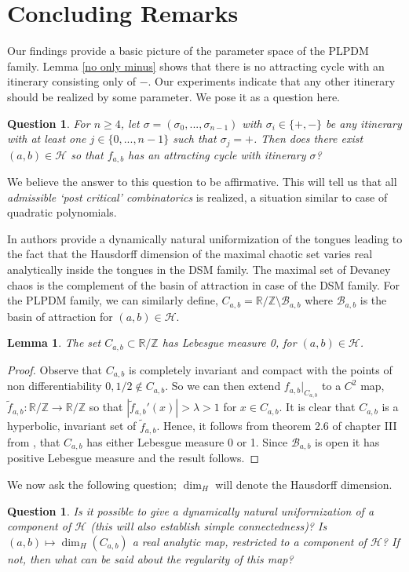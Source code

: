 \documentclass[12pt]{amsart}
\numberwithin{equation}{section}
\newtheorem{lemma}[theorem]{Lemma}
\newtheorem{qn}[theorem]{Question}
\theoremstyle{remark}
\begin{document}
{\section{Concluding Remarks}
Our findings provide a basic picture of the parameter space of the PLPDM family. Lemma \ref{no only minus} shows that there is no attracting cycle with an itinerary consisting only of $-$.  Our experiments indicate that any other itinerary should be realized by some parameter. We pose it as a question here. 
\begin{qn}
    For $ n \geq 4$,  let $\sigma=(\sigma_0,...,\sigma_{n-1}) $ with $\sigma_i \in \{+,-\}$ be any itinerary with at least one $j \in \{0,...,n-1\}$  such that $\sigma_j=+$. Then does there exist $(a,b) \in \mathcal{H}$ so that $f_{a,b}$ has an attracting cycle with itinerary $\sigma$?
\end{qn}
We believe the answer to this question to be affirmative. This will tell us that all \textit{admissible `post critical' combinatorics} is realized, a situation similar to case of quadratic polynomials.   
\vspace{.1cm}

In \cite{BBM} authors provide a dynamically natural uniformization of the tongues leading to the fact that the Hausdorff dimension of the maximal chaotic set varies real analytically inside the tongues in the DSM family. The maximal set of Devaney chaos is the  complement of the basin of attraction in case of the DSM family. For the PLPDM family, we can similarly define, $C_{a,b}= \mathbb{R/Z}\setminus \mathcal{B}_{a,b}$ where $\mathcal{B}_{a,b}$ is the basin of attraction for $(a,b) \in \mathcal{H}$.
\begin{lemma}
    The set $C_{a,b} \subset \mathbb{R/Z}$ has Lebesgue measure 0, for $(a,b) \in \mathcal{H}$. 
\end{lemma}
\begin{proof}
    Observe that $C_{a,b}$
is completely invariant and compact with the points of non differentiability  $0,1/2 \notin C_{a,b}$. So we can then extend $f_{a,b}|_{C_{a,b}}$ to a $C^2$ map, $\tilde{f}_{a,b}: \mathbb{R/Z} \to \mathbb{R/Z}$ so that $|\tilde{f}_{a,b}'(x)|>\lambda>1$ for $x \in C_{a,b}$. It is clear that $C_{a,b}$ is a hyperbolic, invariant set of $\tilde{f}_{a,b}$. Hence, it follows from  theorem 2.6  of chapter III from \cite{DS}, that  $C_{a,b}$ has either Lebesgue measure 0 or 1. Since $\mathcal{B}_{a,b}$ is open it has  positive Lebesgue measure and the result follows.
\end{proof}
We now ask the following question; $\dim_{H}$ will denote the Hausdorff dimension. 
\begin{qn}
    Is it possible to give a dynamically natural uniformization of a component of $\mathcal{H}$ (this will also establish simple connectedness)? Is $(a,b) \mapsto \dim_{H}(C_{a,b})$ a real analytic map, restricted to a component of $\mathcal{H}$? If not, then what can be said about the regularity of this map?
\end{qn}







}
\end{document}
